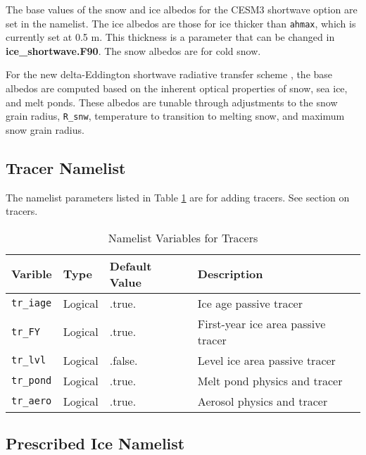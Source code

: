 The base values of the snow and ice albedos for the CESM3 shortwave option
are set in the namelist.  The ice albedos are those for ice thicker than 
{\tt ahmax}, which is currently set at 0.5 m.  This thickness is a parameter 
that can be changed in {\bf ice\_shortwave.F90}. The snow albedos are for 
cold snow. 

For the new delta-Eddington shortwave radiative transfer scheme 
\cite{Briegleb07}, the base albedos are computed based on the inherent 
optical properties of snow, sea ice, and melt ponds. These albedos are 
tunable through adjustments to the snow grain radius, {\tt R\_snw}, 
temperature to transition to melting snow, and maximum snow grain radius.

\subsection{Tracer Namelist}

The namelist parameters listed in Table \ref{table:tracer_nml} are for
adding tracers. See section on tracers.

\begin{table}
  \begin{center}
  \caption{Namelist Variables for Tracers}
  \label{table:tracer_nml}
  \begin{tabular}{p{2.5cm}p{2.5cm}p{3cm}p{6.0cm}} \hline
  Varible & Type & Default Value & Description               \\
\hline \hline

{\tt tr\_iage} & Logical & .true. &  Ice age passive tracer \\

{\tt tr\_FY} & Logical & .true. &  First-year ice area passive tracer \\

{\tt tr\_lvl} & Logical & .false. &  Level ice area passive tracer \\

{\tt tr\_pond} & Logical & .true. &  Melt pond physics and tracer \\

{\tt tr\_aero} & Logical & .true. &  Aerosol physics and tracer \\

  \hline
  \end{tabular}
  \end{center}
\end{table}

\subsection{Prescribed Ice Namelist}

